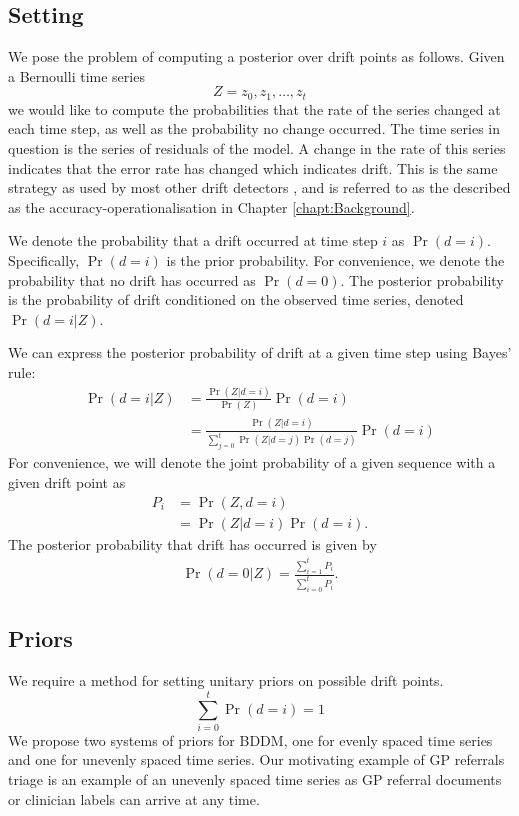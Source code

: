 \subsection{Setting}

We pose the problem of computing a posterior over drift points as follows. Given a Bernoulli time series 
\begin{equation}
    Z=z_0,z_1,\dots,z_t
\end{equation}
we would like to compute the probabilities that the rate of the series changed at each time step, as well as the probability no change occurred. The time series in question is the series of residuals of the model. A change in the rate of this series indicates that the error rate has changed which indicates drift. This is the same strategy as used by most other drift detectors \cite{DDM}\cite{ADWIN}\cite{BCMC}, and is referred to as the described as the accuracy-operationalisation in Chapter \ref{chapt:Background}.

We denote the probability that a drift occurred at time step $i$ as $\Pr(d=i)$. Specifically, $\Pr(d=i)$ is the prior probability. For convenience, we denote the probability that no drift has occurred as $\Pr(d=0)$. The posterior probability is the probability of drift conditioned on the observed time series, denoted $\Pr(d=i|Z)$. 

We can express the posterior probability of drift at a given time step using Bayes' rule:
\begin{align}
  \Pr(d=i|Z) &= \frac{\Pr(Z|d=i)}{\Pr(Z)}\Pr(d=i) \\
  &= \frac{\Pr(Z|d=i)}{\sum_{j=0}^t\Pr(Z|d=j)\Pr(d=j)}\Pr(d=i) \label{eq:posterior}
\end{align}
For convenience, we will denote the joint probability of a given sequence with a given drift point as
\begin{align}
  P_i &= \Pr(Z, d=i) \\
  &= \Pr(Z|d=i)\Pr(d=i).
\end{align}
The posterior probability that drift has occurred is given by
\begin{align}
  \Pr(d=0|Z) = \frac{\sum_{i=1}^t P_i}{\sum_{i=0}^t P_i}.
\end{align}

\subsection{Priors}

We require a method for setting unitary priors on possible drift points.
\begin{equation}
  \sum_{i=0}^t \Pr(d=i) = 1
\end{equation}
We propose two systems of priors for BDDM, one for evenly spaced time series and one for unevenly spaced time series. Our motivating example of GP referrals triage is an example of an unevenly spaced time series as GP referral documents or clinician labels can arrive at any time.

